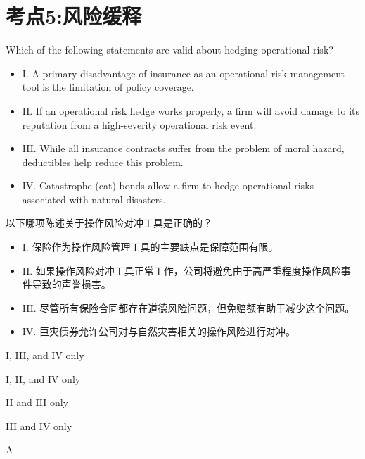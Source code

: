 \documentclass{article}
\newcounter{question} %
\begin{document}
\section{考点5:风险缓释}
\setcounter{question}{0}
\begin{question}
    Which of the following statements are valid about hedging operational risk?
    \begin{itemize}
        \item I. A primary disadvantage of insurance as an operational risk management tool is the limitation of policy coverage.
        \item II. If an operational risk hedge works properly, a firm will avoid damage to its reputation from a high-severity operational risk event.
        \item III. While all insurance contracts suffer from the problem of moral hazard, deductibles help reduce this problem.
        \item IV. Catastrophe (cat) bonds allow a firm to hedge operational risks associated with natural disasters.
    \end{itemize}
    以下哪项陈述关于操作风险对冲工具是正确的？
    \begin{itemize}
        \item I. 保险作为操作风险管理工具的主要缺点是保障范围有限。
        \item II. 如果操作风险对冲工具正常工作，公司将避免由于高严重程度操作风险事件导致的声誉损害。
        \item III. 尽管所有保险合同都存在道德风险问题，但免赔额有助于减少这个问题。
        \item IV. 巨灾债券允许公司对与自然灾害相关的操作风险进行对冲。
    \end{itemize}
\end{question}

\begin{choices}
    \item I, III, and IV only
    \item I, II, and IV only
    \item II and III only
    \item III and IV only
\end{choices}

\begin{correctanswer}
    A
\end{correctanswer}
\end{document}
